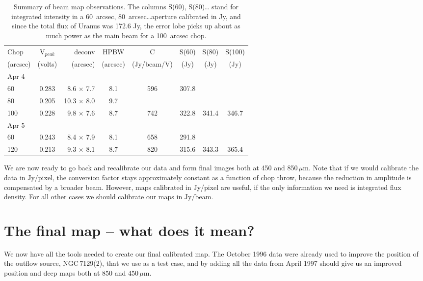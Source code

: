 \documentclass[twoside,11pt]{article}
\newcommand{\mic}{\mbox{\,${\mu}$m}}               %
\newcommand{\xlabel}[1]{}
\begin{document}
{\begin{table}
\caption{Summary of beam map observations. The columns S(60), S(80)\ldots
stand for integrated intensity in a 60~arcsec, 80~arcsec\ldots aperture calibrated in Jy,
and since the total flux of Uranus was 172.6 Jy, the error lobe picks up about
as much power as the main beam for a 100~arcsec chop.}
\begin{center}
\begin{tabular}{lcrccccc}
\hline
Chop  &  V$_{peak}$& deconv & HPBW &  C & S(60) & S(80)&S(100)\\ 
(arcsec) & (volts) & (arcsec) & (arcsec)& (Jy/beam/V) & (Jy) & (Jy) & (Jy)\\
\hline
\multicolumn{8}{l}{Apr 4}        \\
60  &   0.283 &  8.6 $\times$ 7.7 &  8.1 & 596  & 307.8 &      &   \\
80  &   0.205 & 10.3 $\times$ 8.0 &  9.7 &      &       &      &   \\
100 &   0.228 &  9.8 $\times$ 7.6 &  8.7 &  742 & 322.8 & 341.4&  346.7\\
\multicolumn{8}{l}{Apr 5}        \\
60  &   0.243 &  8.4 $\times$ 7.9 &  8.1 &  658 & 291.8 &      &     \\
120 &   0.213 &  9.3 $\times$ 8.1 &  8.7 &  820 & 315.6 & 343.3&  365.4\\
\hline
\end{tabular}
\label{tab:beams}
\end{center}
\end{table}



We are now ready to go back and recalibrate our data and form final
images both at 450 and 850\mic. Note that if we would calibrate the data
in Jy/pixel, the conversion factor stays approximately constant as a
function of chop throw, because the reduction in amplitude is compensated
by a broader beam. However, maps calibrated in Jy/pixel are useful,
if the only information we need is integrated flux density. For all
other cases we should calibrate our maps in Jy/beam.

\section{\xlabel{final}The final map -- what does it mean?\label{final}}
 
We now have all the tools needed to create our final calibrated map. 
The October 1996 data were already used to improve the position of the
outflow source, NGC\,7129(2), that we use as a test case, and by adding
all the data from April 1997 should give us an improved position and
deep maps both at 850 and 450\mic. 

}
\end{document}
